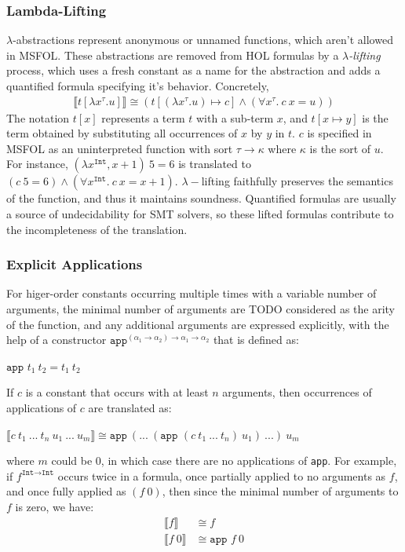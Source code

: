 \documentclass{article}
\begin{document}
	\subsubsection{Lambda-Lifting}
	$\lambda$-abstractions represent 
	anonymous or unnamed functions, 
	which aren't allowed in MSFOL.
	These abstractions are removed
	from HOL formulas by a 
	\textit{$\lambda$-lifting} process,
	which uses a fresh constant as a
	name for the abstraction and adds 
	a quantified formula specifying 
	it's behavior. Concretely,
	\begin{align*}
	\llbracket t[\lambda x^{\tau}.u]
	\rrbracket \cong 
	(t[(\lambda x^{\tau}.u) \mapsto c]
	\land (\forall x^{\tau}.\ c\ x = u))
	\end{align*}
	The notation $t[x]$ represents a 
	term $t$ with a sub-term $x$, 
	and $t[x \mapsto y]$ is the 
	term obtained by substituting all 
	occurrences of $x$ by $y$ in $t$.
	$c$ is specified in MSFOL as an 
	uninterpreted function with sort 
	$\tau \to \kappa$ where $\kappa$ 
	is the sort of $u$. For instance, 
	$(\lambda x^{\texttt{Int}}, x + 1)\ 
	5 = 6$
	is translated to $(c\ 5 = 6) \land
	(\forall x^{\texttt{Int}}.\ 
	c\ x = x + 1)$. $\lambda-$lifting
	faithfully preserves the 
	semantics of the function, and 
	thus it maintains soundness. 
	Quantified formulas are usually a 
	source of undecidability for SMT 
	solvers, so these lifted formulas 
	contribute to the incompleteness
	of the translation.
	
	\subsubsection{Explicit Applications}
	For higer-order constants 
	occurring multiple times with 
	a variable number 
	of arguments, the minimal 
	number of arguments are TODO
	considered as the arity of the 
	function, and any additional 
	arguments are expressed 
	explicitly, with the help of a 
	constructor 
	$\texttt{app}^{(\alpha_1 \to 
		\alpha_2) \to \alpha_1 \to 
		\alpha_2}$ that is defined as:
	\begin{center}
		$\texttt{app }t_1\ t_2 = 
		t_1\ t_2$
	\end{center}
	If $c$ is a constant that 
	occurs with at least $n$
	arguments, then 
	occurrences of applications 
	of $c$ are translated as:
	\begin{center}
		$\llbracket c\ t_1\ ...\ t_n
		\ u_1\ ...\ u_m \rrbracket
		\cong \texttt{app}\ (...\ 
		(\texttt{app }(c\ t_1\ 
		...\ t_n)\ u_1)	\ ...)\ u_m$
	\end{center}
	where $m$ could be $0$, in which 
	case there are no applications 
	of \texttt{app}. For example, if 
	$f^{\texttt{Int} \to \texttt{Int}}$ 
	occurs twice in a formula, once 
	partially applied to no arguments 
	as $f$, and once fully applied as 
	$(f\ 0)$, then since the minimal 
	number of arguments to $f$ is 
	zero, we have:
	\begin{align*}
	\llbracket f \rrbracket &\cong
	f\\
	\llbracket f\ 0 \rrbracket &\cong
	\texttt{app } f\ 0
	\end{align*}
	
\end{document}
